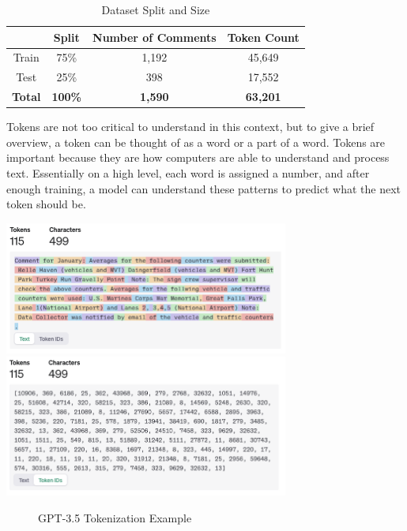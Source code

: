 \documentclass[12pt]{article}
\begin{document}
\begin{center}
\begin{table}[H]
    \centering
    \begin{tabular}{|c|c|c|c|}
        \hline
         & Split & Number of Comments & Token Count \\
        \hline
        Train & 75\% & 1,192 & 45,649 \\
        \hline
        Test & 25\% & 398 & 17,552 \\
        \hline
        \textbf{Total} & \textbf{100\%} & \textbf{1,590} & \textbf{63,201} \\
        \hline
    \end{tabular}
    \caption{Dataset Split and Size}
\end{table}
\end{center}
Tokens are not too critical to understand in this context, but to give a brief overview, a token can be thought of as a word or a part of a word. Tokens are important because they are how computers are able to understand and process text. Essentially on a high level, each word is assigned a number, and after enough training, a model can understand these patterns to predict what the next token should be.

\begin{center}
    \includegraphics[width=0.7\textwidth]{../Visuals/token_words.png}
    \includegraphics[width=0.7\textwidth]{../Visuals/token_ids.png}
    \begin{figure}[H]
        \caption{GPT-3.5 Tokenization Example \cite{openaitokenizer}}
    \end{figure}
\end{center}
\end{document}
